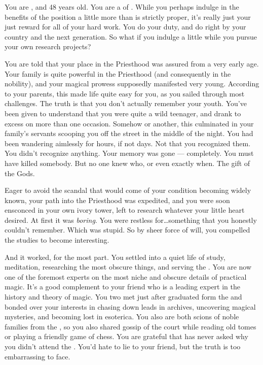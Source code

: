 \documentclass[char]{GL2020}
\begin{document}
\name{\cHedonist{}}

You are \cHedonist{\intro}, and 48 years old. You are a \cHedonist{\cleric} of \cFarmGod{}. While you perhaps indulge in the benefits of the position a little more than is strictly proper, it’s really just your just reward for all of your hard work. You do your duty, and do right by your country and the next generation. So what if you indulge a little while you pursue your own research projects?

You are told that your place in the Priesthood was assured from a very early age. Your family is quite powerful in the Priesthood (and consequently in the nobility), and your magical prowess supposedly manifested very young. According to your parents, this made life quite easy for you, as you sailed through most challenges. The truth is that you don’t actually remember your youth. You’ve been given to understand that you were quite a wild teenager, and drank to excess on more than one occasion. Somehow or another, this culminated in your family’s servants scooping you off the street in the middle of the night. You had been wandering aimlessly for hours, if not days. Not that you recognized them. You didn’t recognize anything. Your memory was gone — completely. You must have killed somebody. But no one knew who, or even exactly when. The gift of the Gods.

Eager to avoid the scandal that would come of your condition becoming widely known, your path into the Priesthood was expedited, and you were soon ensconced in your own ivory tower, left to research whatever your little heart desired. At first it was \emph{boring}. You were restless for\ldots something that you honestly couldn’t remember. Which was stupid. So by sheer force of will, you compelled the studies to become interesting.

And it worked, for the most part. You settled into a quiet life of study, meditation, researching the most obscure things, and serving the \pFarmers{}. You are now one of the foremost experts on  the most niche and obscure details of practical magic. It’s a good complement to your friend \cWildCard{} who is a leading expert in the history and theory of magic. You two met just after \cWildCard{\they} graduated form the \pSchool{} and bonded over your interests in chasing down leads in archives, uncovering magical mysteries, and becoming lost in esoterica. You also are both scions of noble families from the \pFarm{}, so you also shared gossip of the court while reading old tomes or playing a friendly game of chess. You are grateful that \cWildCard{} has never asked why you didn’t attend the \pSc{}. You’d hate to lie to your friend, but the truth is too embarrassing to face.
\end{document}
